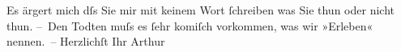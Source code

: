 \begin{ledgroupsized}[t]{13cm}
           \pstart
           Es ärgert mich dſs Sie mir mit keinem Wort ſchreiben was Sie thun oder nicht
               thun.\pend
           \pstart
           – Den Todten muſs es ſehr komiſch vorkommen, was wir »Erleben« nennen. – \pend
           \pstart Herzlichſt Ihr \spacefill\mbox{Arthur}\pend{}\endnumbering{}\end{ledgroupsized}  \newcommand{\dateiname}{L00933}\newcommand{\titel}{Arthur Schnitzler an Richard Beer-Hofmann, 6. 7. 1899}\newcommand{\editorInnen}{Martin Anton Müller und Gerd-Hermann Susen}
      